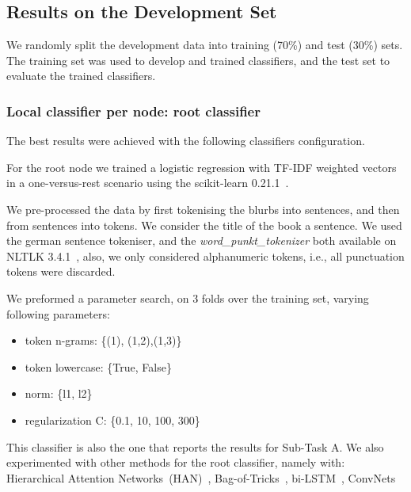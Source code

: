 \documentclass[11pt,a4paper]{article}
\begin{document}
\subsection{Results on the Development Set}

We randomly split the development data into training (70\%) and test (30\%) sets.
The training set was used to develop and trained classifiers, and the test set
to evaluate the trained classifiers.

\subsubsection{Local classifier per node: root classifier}

The best results were achieved with the following classifiers configuration.

For the root node we trained a logistic regression with TF-IDF weighted vectors
in a one-versus-rest scenario using the scikit-learn 0.21.1~\cite{Pedregosa:2011:SML:1953048.2078195}.


We pre-processed the data by first tokenising the blurbs into sentences, and then
from sentences into tokens. We consider the title of the book a sentence. We used
the german sentence tokeniser, and the \textit {word\_punkt\_tokenizer} both available
on NLTLK 3.4.1~\cite{Bird:2009:NLP:1717171}, also, we only considered alphanumeric
tokens, i.e., all punctuation tokens were discarded.


We preformed a parameter search, on 3 folds over the training set, varying following parameters:

\begin{itemize}
\item token n-grams: \{(1), (1,2),(1,3)\}
\item token lowercase: \{True, False\}
\item norm: \{l1, l2\}
\item regularization C: \{0.1, 10, 100, 300\}
\end{itemize}

This classifier is also the one that reports the results for Sub-Task A. We also experimented with
other methods for the root classifier, namely with: Hierarchical Attention Networks~(HAN)~\cite{yang-etal-2016-hierarchical},
Bag-of-Tricks~\cite{joulin-etal-2017-bag}, bi-LSTM~\cite{Hochreiter:1997:LSM:1246443.1246450}, ConvNets~\cite{kim-2014-convolutional}
\end{document}
